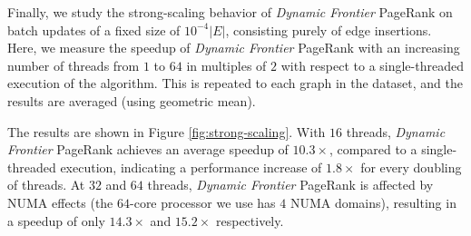 Finally, we study the strong-scaling behavior of \textit{Dynamic Frontier} PageRank on batch updates of a fixed size of $10^{-4} |E|$, consisting purely of edge insertions. Here, we measure the speedup of \textit{Dynamic Frontier} PageRank with an increasing number of threads from $1$ to $64$ in multiples of $2$ with respect to a single-threaded execution of the algorithm. This is repeated to each graph in the dataset, and the results are averaged (using geometric mean).

The results are shown in Figure \ref{fig:strong-scaling}. With $16$ threads, \textit{Dynamic Frontier} PageRank achieves an average speedup of $10.3\times$, compared to a single-threaded execution, indicating a performance increase of $1.8\times$ for every doubling of threads. At $32$ and $64$ threads, \textit{Dynamic Frontier} PageRank is affected by NUMA effects (the $64$-core processor we use has $4$ NUMA domains), resulting in a speedup of only $14.3\times$ and $15.2\times$ respectively.


\ignore{}

